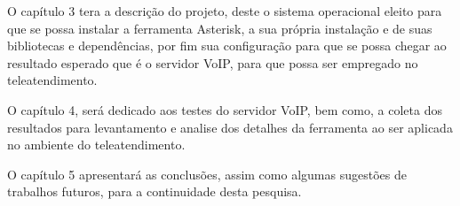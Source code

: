 O capítulo 3 tera a descrição do projeto, deste o sistema operacional eleito para que se possa instalar a ferramenta Asterisk, a sua própria instalação e de suas bibliotecas e dependências, por fim sua configuração para que se possa chegar ao resultado esperado que é o servidor VoIP, para que possa ser empregado no teleatendimento.

O capítulo 4, será dedicado aos testes do servidor VoIP, bem como, a coleta dos resultados para levantamento e analise dos detalhes da ferramenta ao ser aplicada no ambiente do teleatendimento.

O capítulo 5 apresentará as conclusões, assim como algumas sugestões de trabalhos futuros, para a continuidade desta pesquisa.
